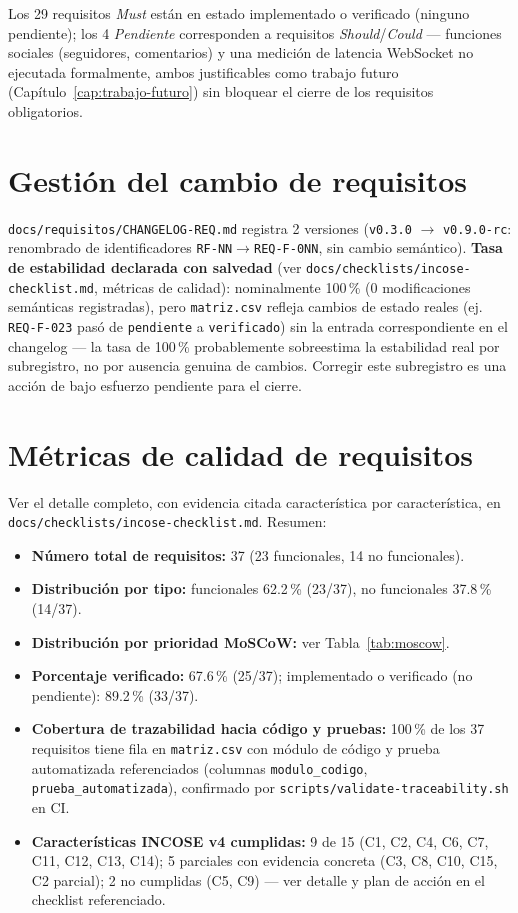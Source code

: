 Los 29 requisitos \emph{Must} están en estado implementado o verificado
(ninguno pendiente); los 4 \emph{Pendiente} corresponden a requisitos
\emph{Should}/\emph{Could} --- funciones sociales (seguidores,
comentarios) y una medición de latencia WebSocket no ejecutada
formalmente, ambos justificables como trabajo futuro
(Capítulo~\ref{cap:trabajo-futuro}) sin bloquear el cierre de los
requisitos obligatorios.

\section{Gestión del cambio de requisitos}

\texttt{docs/requisitos/CHANGELOG-REQ.md} registra 2 versiones
(\texttt{v0.3.0} $\to$ \texttt{v0.9.0-rc}: renombrado de identificadores
\texttt{RF-NN}$\to$\texttt{REQ-F-0NN}, sin cambio semántico). \textbf{Tasa
de estabilidad declarada con salvedad} (ver
\texttt{docs/checklists/incose-checklist.md}, métricas de calidad):
nominalmente 100\,\% (0 modificaciones semánticas registradas), pero
\texttt{matriz.csv} refleja cambios de estado reales (ej.
\texttt{REQ-F-023} pasó de \texttt{pendiente} a \texttt{verificado}) sin
la entrada correspondiente en el changelog --- la tasa de 100\,\%
probablemente sobreestima la estabilidad real por subregistro, no por
ausencia genuina de cambios. Corregir este subregistro es una acción de
bajo esfuerzo pendiente para el cierre.

\section{Métricas de calidad de requisitos}

Ver el detalle completo, con evidencia citada característica por
característica, en \texttt{docs/checklists/incose-checklist.md}. Resumen:

\begin{itemize}
  \item \textbf{Número total de requisitos:} 37 (23 funcionales, 14 no
    funcionales).
  \item \textbf{Distribución por tipo:} funcionales 62.2\,\% (23/37), no
    funcionales 37.8\,\% (14/37).
  \item \textbf{Distribución por prioridad MoSCoW:} ver
    Tabla~\ref{tab:moscow}.
  \item \textbf{Porcentaje verificado:} 67.6\,\% (25/37); implementado o
    verificado (no pendiente): 89.2\,\% (33/37).
  \item \textbf{Cobertura de trazabilidad hacia código y pruebas:}
    100\,\% de los 37 requisitos tiene fila en \texttt{matriz.csv} con
    módulo de código y prueba automatizada referenciados (columnas
    \texttt{modulo\_codigo}, \texttt{prueba\_automatizada}), confirmado
    por \texttt{scripts/validate-traceability.sh} en CI.
  \item \textbf{Características INCOSE v4 cumplidas:} 9 de 15 (C1, C2,
    C4, C6, C7, C11, C12, C13, C14); 5 parciales con evidencia concreta
    (C3, C8, C10, C15, C2 parcial); 2 no cumplidas (C5, C9) --- ver
    detalle y plan de acción en el checklist referenciado.
\end{itemize}
